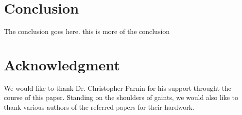 \documentclass[10pt, conference, compsocconf]{IEEEtran}
\begin{document}
%





\section{Conclusion}
The conclusion goes here. this is more of the conclusion



\section*{Acknowledgment}


We would like to thank Dr. Christopher Parnin for his support throught the course of this paper. Standing on the shoulders of gaints, we would also like to thank various authors of the referred papers for their hardwork. 


\end{document}
